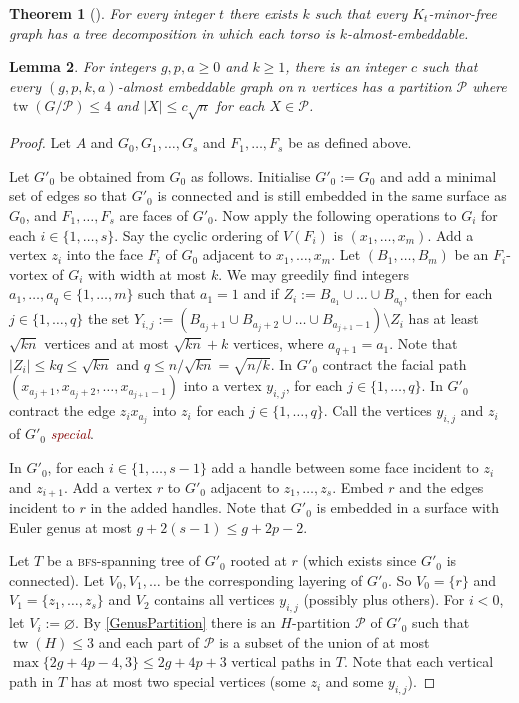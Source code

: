 \documentclass[12pt]{article}
\newcommand{\defn}[1]{\textcolor{Maroon}{\emph{#1}}}
\renewcommand{\emptyset}{\varnothing}
\renewcommand{\geq}{\geqslant}
\renewcommand{\leq}{\leqslant}
\DeclareMathOperator{\tw}{tw}
\newcommand{\PP}{\mathcal{P}}
\theoremstyle{plain}
\newtheorem{thm}{Theorem}
\newtheorem{lem}[thm]{Lemma}
\theoremstyle{definition}
\begin{document}
\begin{thm}[\citep{RS-XVI}]
\label{GMST}
For every integer $t$ there exists $k$ such that every $K_t$-minor-free graph has a tree decomposition in which each torso is $k$-almost-embeddable.
\end{thm}

\begin{lem}
\label{AlmostEmbeddable4}
For integers $g,p,a\geq 0$ and $k\geq 1$, there is an integer $c$ such that every $(g,p,k,a)$-almost embeddable graph on $n$ vertices has a partition $\PP$ where $\tw(G/\PP)\leq 4$ and $|X|\leq c\sqrt{n}$ for each $X\in\PP$.
\end{lem}

\begin{proof}
Let $A$ and $G_0,G_1,\dots,G_s$ and $F_1,\dots,F_s$ be as defined above. 
	
Let $G'_0$ be obtained from $G_0$ as follows. Initialise $G'_0:=G_0$ and add a minimal set of edges so that $G'_0$ is connected and is still embedded in the same surface as $G_0$, 
and $F_1,\dots,F_s$ are faces of $G'_0$. Now apply the following operations to $G_i$ for each $i\in\{1,\dots,s\}$. Say the cyclic ordering of $V(F_i)$ is $(x_1,\dots,x_m)$. Add a vertex $z_i$ into the face $F_i$ of $G_0$ adjacent to $x_1,\dots,x_m$.  Let $(B_1,\dots,B_m)$ be an $F_i$-vortex of $G_i$ with width at most $k$. We may greedily find integers $a_1,\dots,a_q\in\{1,\dots,m\}$  such that $a_1=1$ and if $Z_i:=B_{a_1}\cup\dots\cup B_{a_q}$, then for each $j\in\{1,\dots,q\}$ the set $Y_{i,j}:=(B_{a_j+1}\cup B_{a_j+2}\cup\dots\cup B_{a_{j+1}-1})\setminus Z_i$ has at least $\sqrt{kn}$ vertices and at most $\sqrt{kn}+k$ vertices, where $a_{q+1}=a_1$. Note that $|Z_i|\leq kq\leq\sqrt{kn}$ and $q \leq n/ \sqrt{kn}=\sqrt{n/k}$. In $G'_0$ contract the facial path $(x_{a_j+1},x_{a_j+2},\dots,x_{a_{j+1}-1})$ into a vertex $y_{i,j}$, for each $j\in\{1,\dots,q\}$. In $G'_0$ contract the edge $z_ix_{a_j}$ into $z_i$ for each $j\in\{1,\dots,q\}$. Call the vertices $y_{i,j}$ and $z_i$ of $G'_0$ \defn{special}.
	
In $G'_0$, for each $i\in\{1,\dots,s-1\}$ add a handle between some face incident to $z_i$ and $z_{i+1}$. Add a vertex $r$ to $G'_0$ adjacent to $z_1,\dots,z_s$. Embed $r$ and the edges incident to $r$ in the added handles. Note that $G'_0$ is embedded in a surface with Euler genus at most $g+2(s-1) \leq g+2p-2$.  
	
Let $T$ be a \textsc{bfs}-spanning tree of $G'_0$ rooted at $r$ (which exists since $G'_0$ is connected). Let $V_0,V_1,\dots$ be the corresponding layering of $G'_0$. So $V_0=\{r\}$ and $V_1=\{z_1,\dots,z_s\}$ and $V_2$ contains all vertices $y_{i,j}$ (possibly plus others). For $i<0$, let $V_i:=\emptyset$. By \cref{GenusPartition} there is an $H$-partition $\PP$ of $G'_0$ such that $\tw(H)\leq 3$ and each part of $\PP$ is a subset of the union of at most $\max\{2g+4p-4,3\}\leq 2g+4p+3$ vertical paths in $T$. Note that each vertical path in $T$ has at most two special vertices (some $z_i$ and some $y_{i,j}$). 
	

\end{proof}
\end{document}
